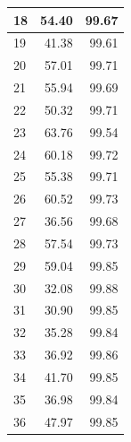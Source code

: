 \begin{table}[]
\begin{tabular}{|l|r|r|}
18             & 54.40                                   & 99.67                             \\ \hline
19             & 41.38                                   & 99.61                             \\ \hline
20             & 57.01                                   & 99.71                             \\ \hline
21             & 55.94                                   & 99.69                             \\ \hline
22             & 50.32                                   & 99.71                             \\ \hline
23             & 63.76                                   & 99.54                             \\ \hline
24             & 60.18                                   & 99.72                             \\ \hline
25             & 55.38                                   & 99.71                             \\ \hline
26             & 60.52                                   & 99.73                             \\ \hline
27             & 36.56                                   & 99.68                             \\ \hline
28             & 57.54                                   & 99.73                             \\ \hline
29             & 59.04                                   & 99.85                             \\ \hline
30             & 32.08                                   & 99.88                             \\ \hline
31             & 30.90                                   & 99.85                             \\ \hline
32             & 35.28                                   & 99.84                             \\ \hline
33             & 36.92                                   & 99.86                             \\ \hline
34             & 41.70                                   & 99.85                             \\ \hline
35             & 36.98                                   & 99.84                             \\ \hline
36             & 47.97                                   & 99.85                             \\ \hline

\end{tabular}
\end{table}
